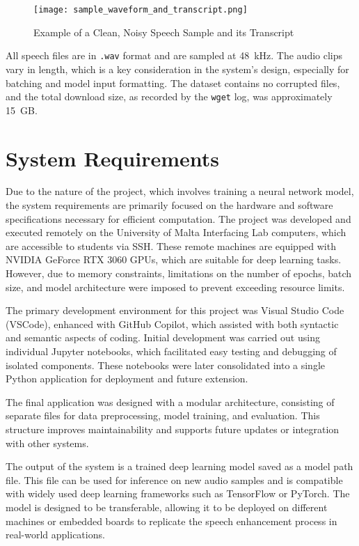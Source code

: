 \begin{figure}[H]
    \centering
    \texttt{[image: sample\_waveform\_and\_transcript.png]}
    \caption{Example of a Clean, Noisy Speech Sample and its Transcript}
    \label{fig:sample_waveform_and_transcript}
\end{figure}

All speech files are in \texttt{.wav} format and are sampled at 48~kHz. The audio clips vary in length, which is a key consideration in the system's design, especially for batching and model input formatting. The dataset contains no corrupted files, and the total download size, as recorded by the \texttt{wget} log, was approximately 15~GB.

\section{System Requirements}
\label{sec:system_requirements}

Due to the nature of the project, which involves training a neural network model, the system requirements are primarily focused on the hardware and software specifications necessary for efficient computation. The project was developed and executed remotely on the University of Malta Interfacing Lab computers, which are accessible to students via SSH. These remote machines are equipped with NVIDIA GeForce RTX 3060 GPUs, which are suitable for deep learning tasks. However, due to memory constraints, limitations on the number of epochs, batch size, and model architecture were imposed to prevent exceeding resource limits.

The primary development environment for this project was Visual Studio Code (VSCode), enhanced with GitHub Copilot, which assisted with both syntactic and semantic aspects of coding. Initial development was carried out using individual Jupyter notebooks, which facilitated easy testing and debugging of isolated components. These notebooks were later consolidated into a single Python application for deployment and future extension.

The final application was designed with a modular architecture, consisting of separate files for data preprocessing, model training, and evaluation. This structure improves maintainability and supports future updates or integration with other systems.

The output of the system is a trained deep learning model saved as a model path file. This file can be used for inference on new audio samples and is compatible with widely used deep learning frameworks such as TensorFlow or PyTorch. The model is designed to be transferable, allowing it to be deployed on different machines or embedded boards to replicate the speech enhancement process in real-world applications.
